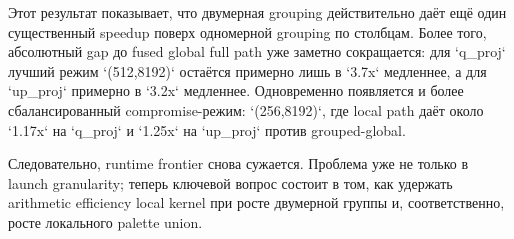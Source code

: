 Этот результат показывает, что двумерная grouping действительно даёт ещё один
существенный speedup поверх одномерной grouping по столбцам. Более того,
абсолютный gap до fused global full path уже заметно сокращается: для `q_proj`
лучший режим `(512,8192)` остаётся примерно лишь в `3.7x` медленнее, а для
`up_proj` примерно в `3.2x` медленнее. Одновременно появляется и более
сбалансированный compromise-режим: `(256,8192)`, где local path даёт около
`1.17x` на `q_proj` и `1.25x` на `up_proj` против grouped-global.

Следовательно, runtime frontier снова сужается. Проблема уже не только в
launch granularity; теперь ключевой вопрос состоит в том, как удержать
arithmetic efficiency local kernel при росте двумерной группы и,
соответственно, росте локального palette union.